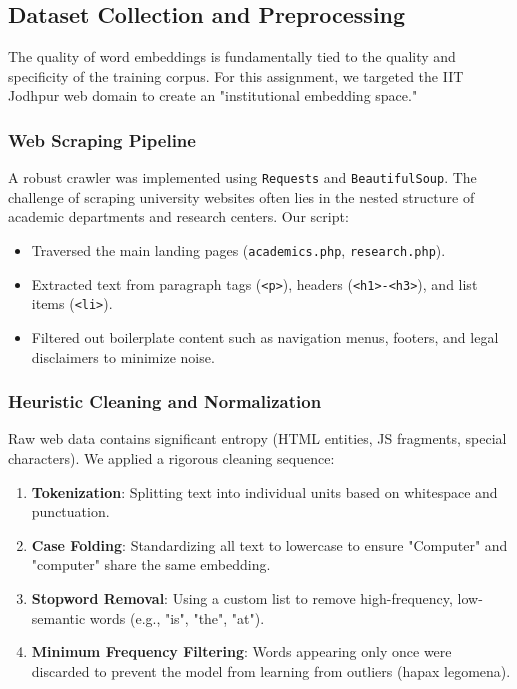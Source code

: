 \documentclass[12pt,a4paper]{article}
\begin{document}
\subsection{Dataset Collection and Preprocessing}
The quality of word embeddings is fundamentally tied to the quality and specificity of the training corpus. For this assignment, we targeted the IIT Jodhpur web domain to create an "institutional embedding space."

\subsubsection{Web Scraping Pipeline}
A robust crawler was implemented using \texttt{Requests} and \texttt{BeautifulSoup}. The challenge of scraping university websites often lies in the nested structure of academic departments and research centers. Our script:
\begin{itemize}
    \item Traversed the main landing pages (\texttt{academics.php}, \texttt{research.php}).
    \item Extracted text from paragraph tags (\texttt{<p>}), headers (\texttt{<h1>-<h3>}), and list items (\texttt{<li>}).
    \item Filtered out boilerplate content such as navigation menus, footers, and legal disclaimers to minimize noise.
\end{itemize}

\subsubsection{Heuristic Cleaning and Normalization}
Raw web data contains significant entropy (HTML entities, JS fragments, special characters). We applied a rigorous cleaning sequence:
\begin{enumerate}
    \item \textbf{Tokenization}: Splitting text into individual units based on whitespace and punctuation.
    \item \textbf{Case Folding}: Standardizing all text to lowercase to ensure "Computer" and "computer" share the same embedding.
    \item \textbf{Stopword Removal}: Using a custom list to remove high-frequency, low-semantic words (e.g., "is", "the", "at").
    \item \textbf{Minimum Frequency Filtering}: Words appearing only once were discarded to prevent the model from learning from outliers (hapax legomena).
\end{enumerate}
\end{document}
